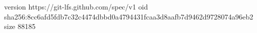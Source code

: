 version https://git-lfs.github.com/spec/v1
oid sha256:8cc6afd5fdb7c32c4474dbbd0a4794431fcaa3d8aafb7d9462d9728074a96eb2
size 88185
